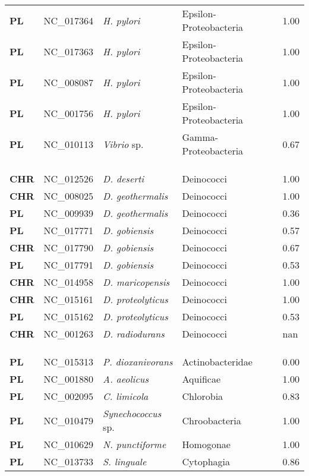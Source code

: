 \begin{adjustwidth}{-3cm}{2cm}
{\begin{supertabular}{>{\bfseries}l|p{0.1\textwidth}p{0.14\textwidth}l|l}
PL & NC\_017364 & \textit{H. pylori} & Epsilon-Proteobacteria & 1.00\\
PL & NC\_017363 & \textit{H. pylori} & Epsilon-Proteobacteria & 1.00\\
PL & NC\_008087 & \textit{H. pylori} & Epsilon-Proteobacteria & 1.00\\
PL & NC\_001756 & \textit{H. pylori} & Epsilon-Proteobacteria & 1.00\\
PL & NC\_010113 & \textit{Vibrio} sp. & Gamma-Proteobacteria & 0.67\\
\\
\\
\hline\\
CHR & NC\_012526 & \textit{D. deserti} & Deinococci & 1.00\\
CHR & NC\_008025 & \textit{D. geothermalis} & Deinococci & 1.00\\
PL & NC\_009939 & \textit{D. geothermalis} & Deinococci & 0.36\\
PL & NC\_017771 & \textit{D. gobiensis} & Deinococci & 0.57\\
CHR & NC\_017790 & \textit{D. gobiensis} & Deinococci & 0.67\\
PL & NC\_017791 & \textit{D. gobiensis} & Deinococci & 0.53\\
CHR & NC\_014958 & \textit{D. maricopensis} & Deinococci & 1.00\\
CHR & NC\_015161 & \textit{D. proteolyticus} & Deinococci & 1.00\\
PL & NC\_015162 & \textit{D. proteolyticus} & Deinococci & 0.53\\
CHR & NC\_001263 & \textit{D. radiodurans} & Deinococci & nan\\
\\
\\
\hline\\
PL & NC\_015313 & \textit{P. dioxanivorans} & Actinobacteridae & 0.00\\
PL & NC\_001880 & \textit{A. aeolicus} & Aquificae & 1.00\\
PL & NC\_002095 & \textit{C. limicola} & Chlorobia & 0.83\\
PL & NC\_010479 & \textit{Synechococcus} sp. & Chroobacteria & 1.00\\
PL & NC\_010629 & \textit{N. punctiforme} & Homogonae & 1.00\\
PL & NC\_013733 & \textit{S. linguale} & Cytophagia & 0.86\\

\end{supertabular}}
\end{adjustwidth}
